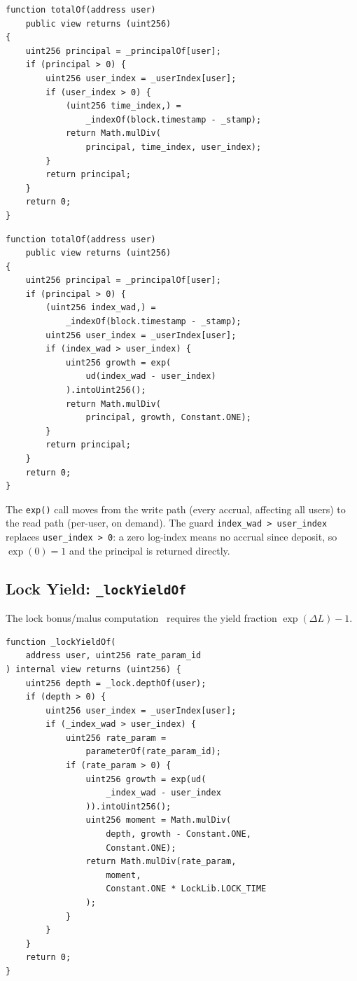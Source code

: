 \documentclass[10pt,a4paper,twocolumn]{article}
\begin{document}
\begin{lstlisting}[language=Solidity, caption={Multiplicative balance query (before)}, label={lst:totalof-ray}]
function totalOf(address user)
    public view returns (uint256)
{
    uint256 principal = _principalOf[user];
    if (principal > 0) {
        uint256 user_index = _userIndex[user];
        if (user_index > 0) {
            (uint256 time_index,) =
                _indexOf(block.timestamp - _stamp);
            return Math.mulDiv(
                principal, time_index, user_index);
        }
        return principal;
    }
    return 0;
}
\end{lstlisting}

\begin{lstlisting}[language=Solidity, caption={Log-space balance query (after)}, label={lst:totalof-log}]
function totalOf(address user)
    public view returns (uint256)
{
    uint256 principal = _principalOf[user];
    if (principal > 0) {
        (uint256 index_wad,) =
            _indexOf(block.timestamp - _stamp);
        uint256 user_index = _userIndex[user];
        if (index_wad > user_index) {
            uint256 growth = exp(
                ud(index_wad - user_index)
            ).intoUint256();
            return Math.mulDiv(
                principal, growth, Constant.ONE);
        }
        return principal;
    }
    return 0;
}
\end{lstlisting}

The \texttt{exp()} call moves from the write path (every accrual, affecting all users) to the read path (per-user, on demand). The guard \texttt{index\_wad > user\_index} replaces \texttt{user\_index > 0}: a zero log-index means no accrual since deposit, so $\exp(0) = 1$ and the principal is returned directly.

\subsection{Lock Yield: \texttt{\_lockYieldOf}}
\label{subsec:lockyield}

The lock bonus/malus computation~\cite{lck} requires the yield fraction $\exp(\Delta L) - 1$.

\begin{lstlisting}[language=Solidity, caption={Lock yield in log-space}, label={lst:lockyield}]
function _lockYieldOf(
    address user, uint256 rate_param_id
) internal view returns (uint256) {
    uint256 depth = _lock.depthOf(user);
    if (depth > 0) {
        uint256 user_index = _userIndex[user];
        if (_index_wad > user_index) {
            uint256 rate_param =
                parameterOf(rate_param_id);
            if (rate_param > 0) {
                uint256 growth = exp(ud(
                    _index_wad - user_index
                )).intoUint256();
                uint256 moment = Math.mulDiv(
                    depth, growth - Constant.ONE,
                    Constant.ONE);
                return Math.mulDiv(rate_param,
                    moment,
                    Constant.ONE * LockLib.LOCK_TIME
                );
            }
        }
    }
    return 0;
}
\end{lstlisting}
\end{document}
